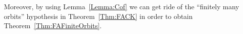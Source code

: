 \documentclass[a4paper]{article}
\newcounter{mycomment}
\newcommand{\mycomment}[2][]{\refstepcounter{mycomment}{\todo[color={green!33},size=\small]{\textbf{Commentaire [\uppercase{#1}\themycomment]:}~#2}}}
\newtheorem{thm}[lem]{Theorem}
\theoremstyle{definition}
\begin{document}
%
%
%
%
Moreover, by using Lemma~\ref{Lemma:Cof} we can get ride of the ``finitely many orbits'' hypothesis in Theorem~\ref{Thm:FACK} in order to obtain Theorem~\ref{Thm:FAFiniteOrbits}.

\end{document}
